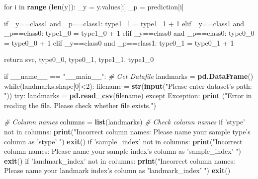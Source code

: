 \documentclass[10pt,letterpaper]{article}
\newenvironment{Shaded}{\begin{snugshade}}{\end{snugshade}}
\newcommand{\KeywordTok}[1]{\textcolor[rgb]{0.13,0.29,0.53}{\textbf{{#1}}}}
\newcommand{\DecValTok}[1]{\textcolor[rgb]{0.00,0.00,0.81}{{#1}}}
\newcommand{\StringTok}[1]{\textcolor[rgb]{0.31,0.60,0.02}{{#1}}}
\newcommand{\CommentTok}[1]{\textcolor[rgb]{0.56,0.35,0.01}{\textit{{#1}}}}
\newcommand{\NormalTok}[1]{{#1}}
\begin{document}
\begin{Shaded}
\begin{Highlighting}[]
    \NormalTok{for i in }\KeywordTok{range} \NormalTok{(}\KeywordTok{len}\NormalTok{(y)):}
\StringTok{        }\NormalTok{_y =}\StringTok{ }\NormalTok{y.values[i]}
        \NormalTok{_p =}\StringTok{ }\NormalTok{prediction[i]}

        \NormalTok{if _y==class1 and _p==class1:}
\StringTok{            }\NormalTok{type1_1 =}\StringTok{ }\NormalTok{type1_1 +}\StringTok{ }\DecValTok{1}
        \NormalTok{elif _y==class1 and _p==class0:}
\StringTok{            }\NormalTok{type1_0 =}\StringTok{ }\NormalTok{type1_0 +}\StringTok{ }\DecValTok{1}
        \NormalTok{elif _y==class0 and _p==class0:}
\StringTok{            }\NormalTok{type0_0 =}\StringTok{ }\NormalTok{type0_0 +}\StringTok{ }\DecValTok{1}
        \NormalTok{elif _y==class0 and _p==class1:}
\StringTok{            }\NormalTok{type0_1 =}\StringTok{ }\NormalTok{type0_1 +}\StringTok{ }\DecValTok{1}
    
    \NormalTok{return svc, type0_0, type0_1, type1_1, type1_0}


\NormalTok{if __name__ ==}\StringTok{ "__main__"}\NormalTok{:}
\StringTok{    }\CommentTok{# Get Datafile}
\StringTok{    }\NormalTok{landmarks =}\StringTok{ }\KeywordTok{pd.DataFrame}\NormalTok{()}
    \NormalTok{while(landmarks.shape[}\DecValTok{0}\NormalTok{]<}\DecValTok{2}\NormalTok{):}
\StringTok{        }\NormalTok{filename =}\StringTok{ }\KeywordTok{str}\NormalTok{(}\KeywordTok{input}\NormalTok{(}\StringTok{"Please enter dataset's path: "}\NormalTok{))}
        \NormalTok{try:}
\StringTok{            }\NormalTok{landmarks =}\StringTok{ }\KeywordTok{pd.read_csv}\NormalTok{(filename)}
        \NormalTok{except Exception:}
\StringTok{            }\KeywordTok{print} \NormalTok{(}\StringTok{"Error in reading the file.}
\StringTok{                Please check whether file exists."}\NormalTok{)}

    \CommentTok{# Column names}
    \NormalTok{columns =}\StringTok{ }\KeywordTok{list}\NormalTok{(landmarks)}
    \CommentTok{# Check column names}
    \NormalTok{if }\StringTok{'stype'} \NormalTok{not in columns:}
\StringTok{        }\KeywordTok{print}\NormalTok{(}\StringTok{"Incorrect column names: Please}
\StringTok{            name your sample type's column as 'stype' "}\NormalTok{)}
        \KeywordTok{exit}\NormalTok{()}
    \NormalTok{if }\StringTok{'sample_index'} \NormalTok{not in columns:}
\StringTok{        }\KeywordTok{print}\NormalTok{(}\StringTok{"Incorrect column names: Please name your}
\StringTok{            sample index's column as 'sample_index' "}\NormalTok{)}
        \KeywordTok{exit}\NormalTok{()}
    \NormalTok{if }\StringTok{'landmark_index'} \NormalTok{not in columns:}
\StringTok{        }\KeywordTok{print}\NormalTok{(}\StringTok{"Incorrect column names: Please name your}
\StringTok{            landmark index's column as 'landmark_index' "}\NormalTok{)}
        \KeywordTok{exit}\NormalTok{()}


\end{Highlighting}
\end{Shaded}
\end{document}
